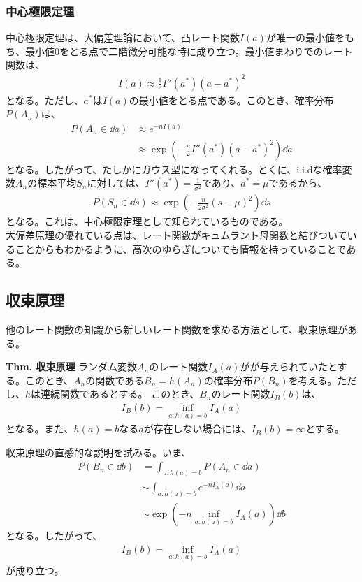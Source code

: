 \documentclass[a4paper,11pt]{jsarticle}
\numberwithin{equation}{section}
\begin{document}
\subsubsection{中心極限定理}
中心極限定理は、大偏差理論において、凸レート関数$I(a)$が唯一の最小値をもち、最小値0をとる点で二階微分可能な時に成り立つ。最小値まわりでのレート関数は、
\begin{align}
    I(a) \approx \frac{1}{2} I''(a^*) (a-a^*)^2
\end{align}
となる。ただし、$a^*$は$I(a)$の最小値をとる点である。このとき、確率分布$P(A_n)$は、
\begin{align}
    P(A_n\in \dd a) &\approx e^{-nI(a)}\\
    &\approx \exp \left( -\frac{n}{2} I''(a^*) (a-a^*)^2 \right)\dd a
\end{align}
となる。したがって、たしかにガウス型になってくれる。とくに、i.i.dな確率変数$A_n$の標本平均$S_n$に対しては、$I''(a^*) = \frac{1}{\sigma^2}$であり、$a^* = \mu$であるから、
\begin{align}
    P(S_n \in \dd s) \approx \exp \left( -\frac{n}{2\sigma^2} (s-\mu)^2 \right)\dd s
\end{align}
となる。これは、中心極限定理として知られているものである。\\
大偏差原理の優れている点は、レート関数がキュムラント母関数と結びついていることからもわかるように、高次のゆらぎについても情報を持っていることである。

\subsection{収束原理}
他のレート関数の知識から新しいレート関数を求める方法として、収束原理がある。
\begin{itembox}[l]{\textbf{Thm. 収束原理}}
    ランダム変数$A_n$のレート関数$I_A(a)$がが与えられていたとする。このとき、$A_n$の関数である$B_n = h(A_n)$の確率分布$P(B_n)$を考える。ただし、$h$は連続関数であるとする。
このとき、$B_n$のレート関数$I_B(b)$は、
\begin{align}
    I_B(b) = \inf_{a: h(a) = b} I_A(a)
\end{align}
となる。また、$h(a) = b$なる$a$が存在しない場合には、$I_B(b) = \infty$とする。
\end{itembox}
収束原理の直感的な説明を試みる。いま、
\begin{align}
    P(B_n \in \dd{b}) &= \int_{a: h(a) = b} P(A_n \in \dd{a})\\
    &\sim \int_{a: h(a) = b} e^{-nI_A(a)} \dd{a}\\
    &\sim \exp({-n\inf_{a: h(a) = b} I_A(a)}) \dd{b}
\end{align}
となる。したがって、
\begin{align}
    I_B(b) = \inf_{a: h(a) = b} I_A(a)
\end{align}
が成り立つ。
\end{document}
